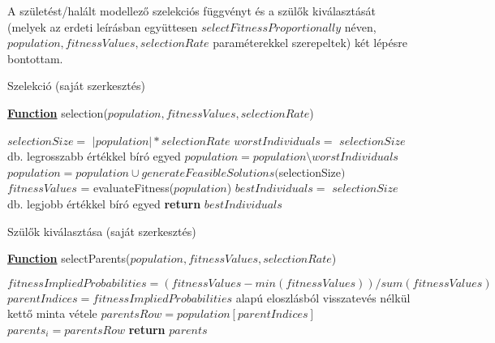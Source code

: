 
A születést/halált modellező szelekciós függvényt és a szülők kiválasztását (melyek az erdeti leírásban együttesen $selectFitnessProportionally$ néven, $population,fitnessValues,selectionRate$ paraméterekkel szerepeltek) két lépésre bontottam.


\begin{algorithm}[H]
\caption{Szelekció (saját szerkesztés)}
\label{alg:selection} 
\textbf{\underline{Function}} selection($population,fitnessValues,selectionRate$)
\begin{algorithmic}[1] %
\STATE $selectionSize =$ $|population|*selectionRate$
\STATE $worstIndividuals =$ $selectionSize$ db. legrosszabb értékkel bíró egyed  
\STATE $population = population \setminus worstIndividuals$
\STATE $population = population \cup generateFeasibleSolutions($selectionSize$)$
\STATE $fitnessValues$ = evaluateFitness($population$)
\STATE $bestIndividuals =$ $selectionSize$ db. legjobb értékkel bíró egyed 
\STATE \textbf{return} $bestIndividuals$
\end{algorithmic}
\end{algorithm}

\begin{algorithm}[H]
\caption{Szülők kiválasztása (saját szerkesztés)}
\label{alg:selectParents} 
\textbf{\underline{Function}} selectParents($population,fitnessValues,selectionRate$)
\begin{algorithmic}[1]
\STATE $fitnessImpliedProbabilities = (fitnessValues - min(fitnessValues)) / sum(fitnessValues)$
	\STATE $parentIndices = fitnessImpliedProbabilities$ alapú eloszlásból visszatevés nélkül kettő minta vétele
	\STATE $parentsRow = population[parentIndices]$
	\STATE $parents_i = parentsRow$
\ENDFOR
\STATE \textbf{return} $parents$
\end{algorithmic}
\end{algorithm}

